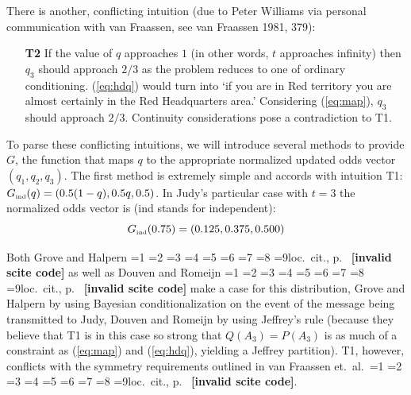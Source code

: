 \documentclass[12pt]{article}
\newcommand{\nonsc}[1]{}
\newcommand{\qnull}[1]{`#1'}
\newif\ifNumericalOrYear
\newcommand{\PageP}{p.~}
\newcommand{\PageP}{}
\newcommand{\nial}{\noindent} %
\newcommand{\scite}[3]{\ifnum#1=1\ifNumericalOrYear\citep{#2}\else\citeyearpar{#2}\fi\else
\ifnum#1=2\ifNumericalOrYear\citep[#3]{#2}\else\citep[{\PageP}#3]{#2}\fi\else
\ifnum#1=3\ifNumericalOrYear(\citet[#3]{#2})\else\citep[{\PageP}#3]{#2}\fi\else
\ifnum#1=4\ifNumericalOrYear\citet{#2}\else\citet{#2}\fi\else
\ifnum#1=5\ifNumericalOrYear(\citet{#2})\else\citep{#2}\fi\else
\ifnum#1=6\ifNumericalOrYear(\citet[#3]{#2})\else\citep[{\PageP}#3]{#2}\fi\else
\ifnum#1=7\ifNumericalOrYear\citep{#2}\else\citealp{#2}\fi\else
\ifnum#1=8\ifNumericalOrYear\citep[#3]{#2}\else\citealp[{\PageP}#3]{#2}\fi\else
\ifnum#1=9\ifNumericalOrYear\citep[#3]{#2}\else{}loc.\ cit., {\PageP}#3\fi\else
\textbf{[invalid scite code]}\fi\fi\fi\fi\fi\fi\fi\fi\fi}
\begin{document}
\nial There is another, conflicting intuition (due to Peter Williams
via personal communication with van Fraassen, see van Fraassen 1981,
379)\nonsc{}:

\begin{enumerate}
\item[\textbf{T2}] If the value of $q$ approaches $1$ (in other words,
  $t$ approaches infinity) then $q_{3}$ should approach $2/3$ as the
  problem reduces to one of ordinary conditioning. ({\ref{eq:hdq}})
  would turn into \qnull{if you are in Red territory you are almost
    certainly in the Red Headquarters area.} Considering
  ({\ref{eq:map}}), $q_{3}$ should approach $2/3$. Continuity
  considerations pose a contradiction to T1.
\end{enumerate}

\nial To parse these conflicting intuitions, we will introduce several
methods to provide $G$, the function that maps $q$ to the appropriate
normalized updated odds vector $(q_{1},q_{2},q_{3})$. The first
method is extremely simple and accords with intuition T1:
$G_{\mbox{{\tiny ind}}}(q)=(0.5(1-q),0.5q,0.5)$. In Judy's particular
case with $t=3$ the normalized odds vector is (ind stands for
independent):
\begin{displaymath}
  G_{\mbox{{\tiny ind}}}(0.75)=(0.125,0.375,0.500)
\end{displaymath}

\nial Both Grove and Halpern \scite{1}{grovehalpern97}{} as well as
Douven and Romeijn \scite{1}{douvenromeijn09}{} make a case for this
distribution, Grove and Halpern by using Bayesian conditionalization
on the event of the message being transmitted to Judy, Douven and
Romeijn by using Jeffrey's rule (because they believe that T1 is in
this case so strong that $Q(A_{3})=P(A_{3})$ is as much of a
constraint as (\ref{eq:map}) and (\ref{eq:hdq}), yielding a Jeffrey
partition). T1, however, conflicts with the symmetry requirements
outlined in van Fraassen et.\ al.\ \scite{1}{fraassenetal86}{}.
\end{document}
